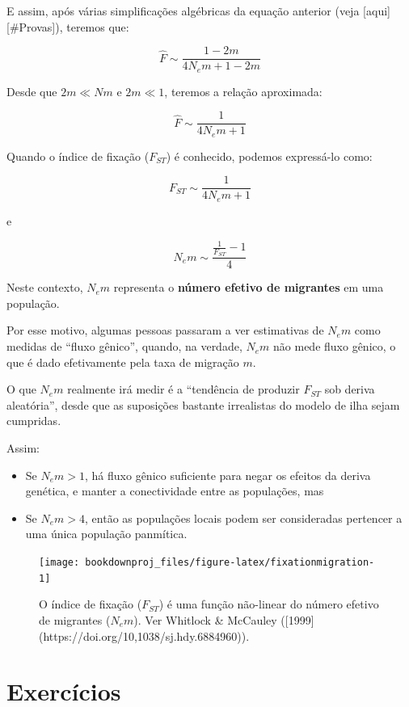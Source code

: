 \documentclass[
]{book}
\begin{document}
E assim, após várias simplificações algébricas da equação anterior (veja {[}aqui{]}{[}\#Provas{]}), teremos que:

\[\hat{F} \sim  \frac{1-2m}{4N_em+1-2m} \]

Desde que \(2m \ll Nm\) e \(2m \ll 1\), teremos a relação aproximada:

\[\hat{F} \sim  \frac{1}{4N_em+1} \]

Quando o índice de fixação (\(F_{ST}\)) é conhecido, podemos expressá-lo como:

\[F_{ST} \sim  \frac{1}{4N_em+1} \]

e

\[N_em \sim  \frac{ \frac{1}{F_{ST}}-1}{4} \]

Neste contexto, \(N_em\) representa o \textbf{número efetivo de migrantes} em uma população.

Por esse motivo, algumas pessoas passaram a ver estimativas de \(N_em\) como medidas de ``fluxo gênico'', quando, na verdade, \(N_em\) não mede fluxo gênico, o que é dado efetivamente pela taxa de migração \(m\).

O que \(N_em\) realmente irá medir é a ``tendência de produzir \(F_{ST}\) sob deriva aleatória'', desde que as suposições bastante irrealistas do modelo de ilha sejam cumpridas.

Assim:

\begin{itemize}
\item
  Se \(N_em > 1\), há fluxo gênico suficiente para negar os efeitos da deriva genética, e manter a conectividade entre as populações, mas
\item
  Se \(N_em > 4\), então as populações locais podem ser consideradas pertencer a uma única população panmítica.
\end{itemize}

\begin{figure}

{\centering \texttt{[image: bookdownproj\_files/figure-latex/fixationmigration-1]} 

}

\caption{O índice de fixação ($F_{ST}$) é uma função não-linear do número efetivo de migrantes ($N_em$). Ver Whitlock & McCauley ([1999](https://doi.org/10,1038/sj.hdy.6884960)).}\label{fig:fixationmigration}
\end{figure}

\hypertarget{exercuxedcios-5}{%
\section{Exercícios}\label{exercuxedcios-5}}
\end{document}
